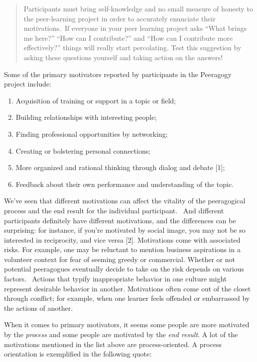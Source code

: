 \begin{quote}
Participants must bring self-knowledge and no small measure of honesty
to the peer-learning project in order to accurately enunciate their
motivations.~If everyone in your peer learning project asks ``What
brings me here?'' ``How can I contribute?'' and ``How can I contribute
more effectively?'' things will really start percolating. Test this
suggestion by asking these questions yourself and taking action on the
answers!
\end{quote}

Some of the primary motivators reported by participants in the Peeragogy
project include:

\begin{enumerate}
\def\labelenumi{\arabic{enumi}.}
\item
  Acquisition of training or support in a topic or field;
\item
  Building relationships with interesting people;
\item
  Finding professional opportunities by networking;
\item
  Creating or bolstering personal connections;
\item
  More organized and rational thinking through dialog and debate
  {{[}1{]}};
\item
  Feedback about their own performance and understanding of the topic.
\end{enumerate}

We've seen that different motivations can affect the vitality of the
peeragogical process and the end result for the individual participant.~
And different participants definitely have different motivations, and
the differences can be surprising: for instance, if you're motivated by
social image, you may not be so interested in reciprocity, and vice
versa {{[}2{]}}. Motivations come with associated risks. For example,
one may be reluctant to mention business aspirations in a volunteer
context for fear of seeming greedy or commercial. Whether or not
potential peeragogues eventually decide to take on the risk depends on
various factors.~ Actions that typify inappropriate behavior in one
culture might represent desirable behavior in another. Motivations often
come out of the closet through conflict; for example, when one learner
feels offended or embarrassed by the actions of another.

When it comes to primary motivators, it seems some people are more
motivated by the \emph{process} and some people are motivated by the
\emph{end result}. A lot of the motivations mentioned in the list above
are process-oriented. A process orientation is exemplified in the
following quote:

